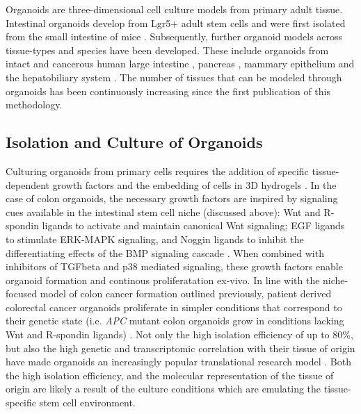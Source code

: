 \begin{flushleft}
Organoids are three-dimensional cell culture models from primary adult tissue. Intestinal organoids develop from Lgr5+ adult stem cells and were first isolated from the small intestine of mice \citep{satoSingleLgr5Stem2009}. Subsequently, further organoid models across tissue-types and species have been developed. These include organoids from intact and cancerous human large intestine \citep{satoLongtermExpansionEpithelial2011}, pancreas \citep{driehuisPancreaticCancerOrganoids2019}, mammary epithelium \citep{zhangEstablishingEstrogenresponsiveMouse2017, sachsLivingBiobankBreast2018} and the hepatobiliary system \citep{huchVitroExpansionSingle2013}. The number of tissues that can be modeled through organoids has been continuously increasing since the first publication of this methodology.

\subsection{Isolation and Culture of Organoids}

Culturing organoids from primary cells requires the addition of specific tissue-dependent growth factors and the embedding of cells in 3D hydrogels \citep{merkerGastrointestinalOrganoidsHow2016}. In the case of colon organoids, the necessary growth factors are inspired by signaling cues available in the intestinal stem cell niche (discussed above): Wnt and R-spondin ligands to activate and maintain canonical Wnt signaling; EGF ligands to stimulate ERK-MAPK signaling, and Noggin ligands to inhibit the differentiating effects of the BMP signaling cascade \citep{satoGrowingSelforganizingMiniguts2013}. When combined with inhibitors of TGFbeta and p38 mediated signaling, these growth factors enable organoid formation and continous proliferatation ex-vivo. In line with the niche-focused model of colon cancer formation outlined previously, patient derived colorectal cancer organoids proliferate in simpler conditions that correspond to their genetic state (i.e. \textit{APC} mutant colon organoids grow in conditions lacking Wnt and R-spondin ligands) \citep{Fujii2016-ax}. Not only the high isolation efficiency of up to 80\%, but also the high genetic and transcriptomic correlation with their tissue of origin have made organoids an increasingly popular translational research model \citep{pauliPersonalizedVitroVivo2017a}. Both the high isolation efficiency, and the molecular representation of the tissue of origin are likely a result of the culture conditions which are emulating the tissue-specific stem cell environment. \par


\end{flushleft}
